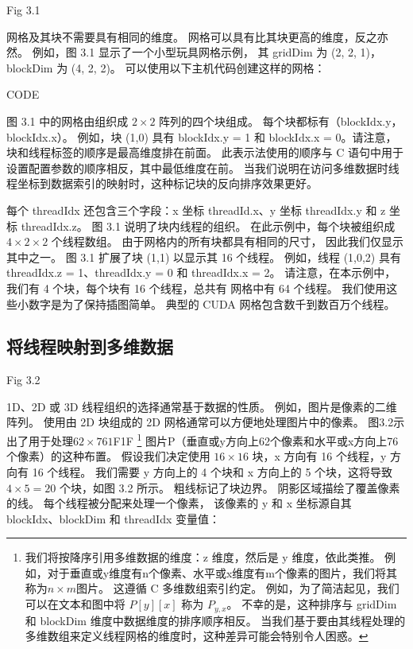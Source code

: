 {\color{red} Fig 3.1}

网格及其块不需要具有相同的维度。 网格可以具有比其块更高的维度，反之亦然。 例如，图 3.1 显示了一个小型玩具网格示例，
其 gridDim 为 (2, 2, 1)，blockDim 为 (4, 2, 2)。 可以使用以下主机代码创建这样的网格：

{\color{red} CODE}

图 3.1 中的网格由组织成 $2 \times 2$ 阵列的四个块组成。 每个块都标有（blockIdx.y，blockIdx.x）。 
例如，块 (1,0) 具有 blockIdx.y = 1 和 blockIdx.x = 0。请注意，块和线程标签的顺序是最高维度排在前面。 
此表示法使用的顺序与 C 语句中用于设置配置参数的顺序相反，其中最低维度在前。 
当我们说明在访问多维数据时线程坐标到数据索引的映射时，这种标记块的反向排序效果更好。

每个 threadIdx 还包含三个字段：x 坐标 threadId.x、y 坐标 threadIdx.y 和 z 坐标 threadIdx.z。 
图 3.1 说明了块内线程的组织。 在此示例中，每个块被组织成 $4 \times 2 \times 2$ 个线程数组。 
由于网格内的所有块都具有相同的尺寸，
因此我们仅显示其中之一。 图 3.1 扩展了块 (1,1) 以显示其 16 个线程。 
例如，线程 (1,0,2) 具有 threadIdx.z = 1、threadIdx.y = 0 和 threadIdx.x = 2。
请注意，在本示例中，我们有 4 个块，每个块有 16 个线程，总共有 网格中有 64 个线程。 
我们使用这些小数字是为了保持插图简单。 典型的 CUDA 网格包含数千到数百万个线程。

\subsection{将线程映射到多维数据}
{\color{red} Fig 3.2}

1D、2D 或 3D 线程组织的选择通常基于数据的性质。 例如，图片是像素的二维阵列。 
使用由 2D 块组成的 2D 网格通常可以方便地处理图片中的像素。 
图3.2示出了用于处理$62 \times 761$F1F
\footnote{我们将按降序引用多维数据的维度：z 维度，然后是 y 维度，依此类推。 
例如，对于垂直或y维度有n个像素、水平或x维度有m个像素的图片，我们将其称为$n \times m$图片。 
这遵循 C 多维数组索引约定。 例如，为了简洁起见，我们可以在文本和图中将 $P[y][x]$ 称为 $P_{y,x}$。 
不幸的是，这种排序与 gridDim 和 blockDim 维度中数据维度的排序顺序相反。 
当我们基于要由其线程处理的多维数组来定义线程网格的维度时，这种差异可能会特别令人困惑。}
图片P（垂直或y方向上62个像素和水平或x方向上76个像素）的这种布置。 
假设我们决定使用 $16 \times 16$ 块，x 方向有 16 个线程，y 方向有 16 个线程。 
我们需要 y 方向上的 4 个块和 x 方向上的 5 个块，这将导致 $4 \times 5 = 20$ 个块，如图 3.2 所示。 
粗线标记了块边界。 阴影区域描绘了覆盖像素的线。 每个线程被分配来处理一个像素，
该像素的 y 和 x 坐标源自其 blockIdx、blockDim 和 threadIdx 变量值：

